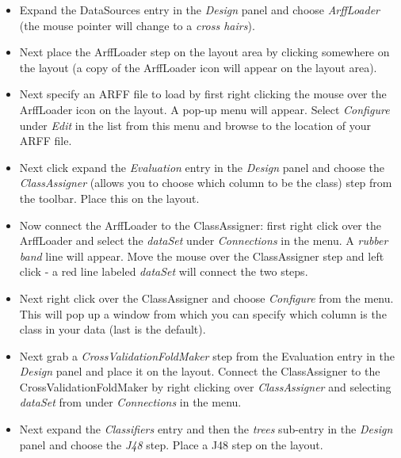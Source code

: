 \begin{itemize}
	\item Expand the DataSources entry in the \textit{Design} panel and
          choose \textit{ArffLoader} (the mouse pointer will change to
          a \textit{cross hairs}).

	\item Next place the ArffLoader step on the layout area by clicking
	somewhere on the layout (a copy of the ArffLoader icon will appear on
	the layout area).

	\item Next specify an ARFF file to load by first right clicking the mouse
	over the ArffLoader icon on the layout. A pop-up menu will
	appear. Select \textit{Configure} under \textit{Edit} in the list from this menu and
	browse to the location of your ARFF file.

	\item Next click expand the \textit{Evaluation} entry in the
          \textit{Design} panel and choose the \textit{ClassAssigner}
          (allows you to choose which column to be the class)
          step from the toolbar. Place this on the layout.

	\item Now connect the ArffLoader to the ClassAssigner: first right click
	over the ArffLoader and select the \textit{dataSet} under \textit{Connections} in
	the menu. A \textit{rubber band} line will appear. Move the mouse over the
	ClassAssigner step and left click - a red line labeled \textit{dataSet}
	will connect the two steps.

	\item Next right click over the ClassAssigner and choose \textit{Configure} from
	the menu. This will pop up a window from which you can specify which
	column is the class in your data (last is the default).

	\item Next grab a \textit{CrossValidationFoldMaker} step
          from the Evaluation entry in the \textit{Design} panel and
          place it on the layout. Connect the ClassAssigner to the
          CrossValidationFoldMaker by right clicking over
          \textit{ClassAssigner} and selecting \textit{dataSet} from
          under \textit{Connections} in the menu.

	\item Next expand the \textit{Classifiers} entry and then the
          \textit{trees} sub-entry in the \textit{Design} panel and
          choose the \textit{J48} step. Place a J48 step on
          the layout.


\end{itemize}
